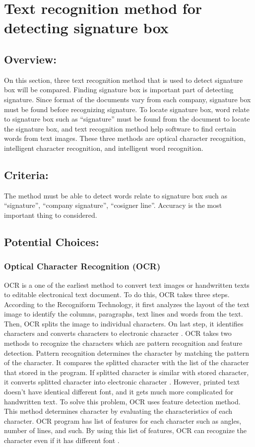 \documentclass[onecolumn, draftclsnofoot,10pt, compsoc]{IEEEtran}
\begin{document}
\section{Text recognition method for detecting signature box}
\subsection{Overview:}
On this section, three text recognition method that is used to detect signature box will be compared. Finding signature box is important part of detecting signature. Since format of the documents vary from each company, signature box must be found before recognizing signature. To locate signature box, word relate to signature box such as \enquote{signature} must be found from the document to locate the signature box, and text recognition method help software to find certain words from text images. These three methods are optical character recognition, intelligent character recognition, and intelligent word recognition.

\subsection{Criteria:}
The method must be able to detect words relate to signature box such as \enquote{signature}, \enquote{company signature}, \enquote{cosigner line}. Accuracy is the most important thing to considered.

\subsection{Potential Choices:}
\subsubsection{Optical Character Recognition (OCR)}
OCR is a one of the earliest method to convert text images or handwritten texts to editable electronical text document. To do this, OCR takes three steps. According to the Recogniform Technology, it first analyzes the layout of the text image to identify the columns, paragraphs, text lines and words from the text. Then, OCR splits the image to individual characters. On last step, it identifies characters and converts characters to electronic character \cite{OC}. OCR takes two methods to recognize the characters which are pattern recognition and feature detection. Pattern recognition determines the character by matching the pattern of the character. It compares the splitted character with the list of the character that stored in the program. If splitted character is similar with stored character, it converts splitted character into electronic character . However, printed text doesn\rq t have identical different font, and it gets much more complicated for handwritten text. To solve this problem, OCR uses feature detection method. This method determines character by evaluating the characteristics of each character. OCR program has list of features for each character such as angles, number of lines, and such. By using this list of features, OCR can recognize the character even if it has different font \cite{OC}.
\end{document}

